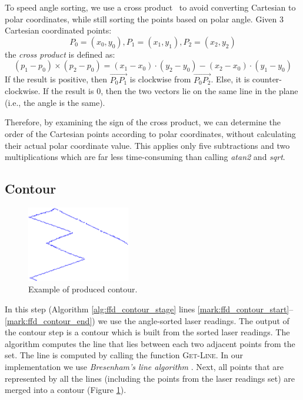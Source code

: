 	To speed angle sorting, we use a cross product~\cite{Cormen2001} to avoid converting
        Cartesian to polar coordinates, while still sorting the points based on polar angle.
	Given 3 Cartesian coordinated points: 
	$$P_0 =(x_0, y_0), P_1 =(x_1, y_1), P_2 =(x_2, y_2)$$  
	the \emph{cross product} is defined as: 
	$$(p_1 - p_0) \times (p_2 -p_0) =
	(x_1-x_0)\cdot(y_2-y_0)-(x_2-x_0)\cdot(y_1-y_0)$$  
	If the result is positive, then $\overrightarrow{P_0P_1}$ is clockwise from
	$\overrightarrow{P_0P_2}$. Else, it is counter-clockwise. If the result is 0,
	then the two vectors lie on the same line in the plane (i.e., the angle is the same).
	
	Therefore, by examining the sign of the cross product, we can determine the
	order of the Cartesian points according to polar coordinates, without
	calculating their actual polar coordinate value. This applies only five
	subtractions and two multiplications which are far less time-consuming than
	calling \emph{atan2} and \emph{sqrt}.	

	

\subsection{Contour}
\begin{figure}
  \centering
    \includegraphics[width=0.4\textwidth,keepaspectratio]{images/get_line_example}
  \caption{Example of produced contour.}
	 \label{fig:get_line_example}
\end{figure}
In this step (Algorithm \ref{alg:ffd_contour_stage} lines
\ref{mark:ffd_contour_start}--\ref{mark:ffd_contour_end}) we use the
angle-sorted laser readings. The output of the contour step is a contour which
is built from the sorted laser readings. The algorithm computes the line that
lies between each two adjacent points from the set. The line is computed by
calling the function \textsc{Get-Line}. In our implementation we use
\emph{Bresenham's line algorithm} \cite{bresenham2010algorithm}. Next, all
points that are represented by all the lines (including the points from the
laser readings set) are merged into a contour (Figure \ref{fig:get_line_example}).

